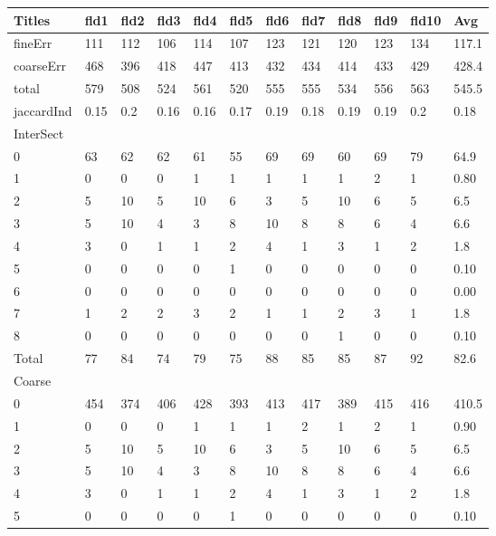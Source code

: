 \documentclass[ms]{nuthesis}
\begin{document}
\FloatBarrier
\begin{table}[h]
  \small
  \centering
  \begin{tabular}{|l||l||l||l||l||l||l||l||l||l||l||l|}\toprule
    Titles & fld1 & fld2 & fld3 & fld4 & fld5 & fld6 & fld7 & fld8 & fld9 & fld10 & Avg \\ \midrule
    fineErr & 111 & 112 & 106 & 114 & 107 & 123 & 121 & 120 & 123 & 134 & 117.1 \\
    coarseErr & 468 & 396 & 418 & 447 & 413 & 432 & 434 & 414 & 433 & 429 & 428.4 \\
    total & 579 & 508 & 524 & 561 & 520 & 555 & 555 & 534 & 556 & 563 & 545.5 \\
    jaccardInd & 0.15 & 0.2 & 0.16 & 0.16 & 0.17 & 0.19 & 0.18 & 0.19 & 0.19 & 0.2 & 0.18 \\
    InterSect &  &  &  &  &  &  &  &  &  &  &  \\
    0 & 63 & 62 & 62 & 61 & 55 & 69 & 69 & 60 & 69 & 79 & 64.9 \\
    1 & 0 & 0 & 0 & 1 & 1 & 1 & 1 & 1 & 2 & 1 & 0.80 \\
    2 & 5 & 10 & 5 & 10 & 6 & 3 & 5 & 10 & 6 & 5 & 6.5 \\
    3 & 5 & 10 & 4 & 3 & 8 & 10 & 8 & 8 & 6 & 4 & 6.6 \\
    4 & 3 & 0 & 1 & 1 & 2 & 4 & 1 & 3 & 1 & 2 & 1.8 \\
    5 & 0 & 0 & 0 & 0 & 1 & 0 & 0 & 0 & 0 & 0 & 0.10 \\
    6 & 0 & 0 & 0 & 0 & 0 & 0 & 0 & 0 & 0 & 0 & 0.00 \\
    7 & 1 & 2 & 2 & 3 & 2 & 1 & 1 & 2 & 3 & 1 & 1.8 \\
    8 & 0 & 0 & 0 & 0 & 0 & 0 & 0 & 1 & 0 & 0 & 0.10 \\
    Total & 77 & 84 & 74 & 79 & 75 & 88 & 85 & 85 & 87 & 92 & 82.6 \\
    Coarse &  &  &  &  &  &  &  &  &  &  &  \\
    0 & 454 & 374 & 406 & 428 & 393 & 413 & 417 & 389 & 415 & 416 & 410.5 \\
    1 & 0 & 0 & 0 & 1 & 1 & 1 & 2 & 1 & 2 & 1 & 0.90 \\
    2 & 5 & 10 & 5 & 10 & 6 & 3 & 5 & 10 & 6 & 5 & 6.5 \\
    3 & 5 & 10 & 4 & 3 & 8 & 10 & 8 & 8 & 6 & 4 & 6.6 \\
    4 & 3 & 0 & 1 & 1 & 2 & 4 & 1 & 3 & 1 & 2 & 1.8 \\
    5 & 0 & 0 & 0 & 0 & 1 & 0 & 0 & 0 & 0 & 0 & 0.10 \\

\end{tabular}
\end{table}
\end{document}
